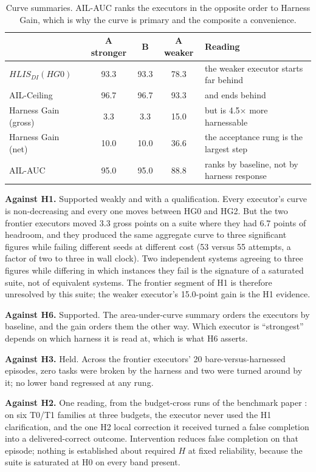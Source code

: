 \begin{table}[!htbp]
\centering\small
\begin{tabularx}{\textwidth}{@{}lcccY@{}}
\toprule
& A stronger & B & A weaker & Reading \\
\midrule
$HLIS_{DI}(HG0)$ & 93.3 & 93.3 & 78.3 & the weaker executor starts far behind \\
AIL-Ceiling & 96.7 & 96.7 & 93.3 & and ends behind \\
Harness Gain (gross) & 3.3 & 3.3 & 15.0 & but is 4.5$\times$ more harnessable \\
Harness Gain (net) & 10.0 & 10.0 & 36.6 & the acceptance rung is the largest step \\
AIL-AUC & 95.0 & 95.0 & 88.8 & ranks by baseline, not by harness response \\
\bottomrule
\end{tabularx}
\caption{Curve summaries. AIL-AUC ranks the executors in the opposite order to Harness Gain, which is why the curve is primary and the composite a convenience.}
\label{tab:summary}
\end{table}

\textbf{Against H1.} Supported weakly and with a qualification. Every executor's curve is non-decreasing and every one moves between HG0 and HG2. But the two frontier executors moved 3.3 gross points on a suite where they had 6.7 points of headroom, and they produced the same aggregate curve to three significant figures while failing different seeds at different cost (53 versus 55 attempts, a factor of two to three in wall clock). Two independent systems agreeing to three figures while differing in which instances they fail is the signature of a saturated suite, not of equivalent systems. The frontier segment of H1 is therefore unresolved by this suite; the weaker executor's 15.0-point gain is the H1 evidence.

\textbf{Against H6.} Supported. The area-under-curve summary orders the executors by baseline, and the gain orders them the other way. Which executor is ``strongest'' depends on which harness it is read at, which is what H6 asserts.

\textbf{Against H3.} Held. Across the frontier executors' 20 bare-versus-harnessed episodes, zero tasks were broken by the harness and two were turned around by it; no lower band regressed at any rung.

\textbf{Against H2.} One reading, from the budget-cross runs of the benchmark paper \citep{yang2026uab}: on six T0/T1 families at three budgets, the executor never used the H1 clarification, and the one H2 local correction it received turned a false completion into a delivered-correct outcome. Intervention reduces false completion on that episode; nothing is established about required $H$ at fixed reliability, because the suite is saturated at H0 on every band present.

